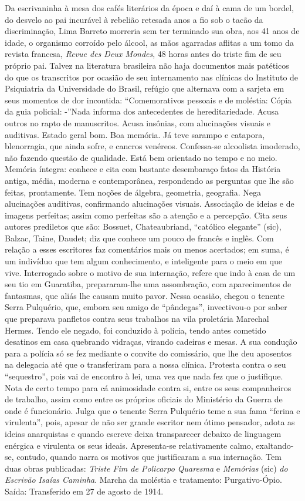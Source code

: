 \documentclass[
  letterpaper,
  DIV=11,
  numbers=noendperiod]{scrreprt}
\begin{document}
Da escrivaninha à mesa dos cafés literários da época e daí à cama de um
bordel, do desvelo ao pai incurável à rebelião retesada anos a fio sob o
tacão da discriminação, Lima Barreto morreria sem ter terminado sua
obra, aos 41 anos de idade, o organismo corroído pelo álcool, as mãos
agarradas aflitas a um tomo da revista francesa, \emph{Revue des Deux
Mondes}, 48 horas antes do triste fim de seu próprio pai. Talvez na
literatura brasileira não haja documentos mais patéticos do que os
transcritos por ocasião de seu internamento nas clínicas do Instituto de
Psiquiatria da Universidade do Brasil, refúgio que alternava com a
sarjeta em seus momentos de dor incontida: ``Comemorativos pessoais e de
moléstia: Cópia da guia policial: -''Nada informa dos antecedentes de
hereditariedade. Acusa outros no rapto de manuscritos. Acusa insônias,
com alucinações visuais e auditivas. Estado geral bom. Boa memória. Já
teve sarampo e catapora, blenorragia, que ainda sofre, e cancros
venéreos. Confessa-se alcoolista imoderado, não fazendo questão de
qualidade. Está bem orientado no tempo e no meio. Memória íntegra:
conhece e cita com bastante desembaraço fatos da História antiga, média,
moderna e contemporânea, respondendo as perguntas que lhe são feitas,
prontamente. Tem noções de álgebra, geometria, geografia. Nega
alucinações auditivas, confirmando alucinações visuais. Associação de
ideias e de imagens perfeitas; assim como perfeitas são a atenção e a
percepção. Cita seus autores prediletos que são: Bossuet, Chateaubriand,
``católico elegante'' (sic), Balzac, Taine, Daudet; diz que conhece um
pouco de francês e inglês. Com relação a esses escritores faz
comentários mais ou menos acertados; em suma, é um indivíduo que tem
algum conhecimento, e inteligente para o meio em que vive. Interrogado
sobre o motivo de sua internação, refere que indo à casa de um seu tio
em Guaratiba, prepararam-lhe uma assombração, com aparecimentos de
fantasmas, que aliás lhe causam muito pavor. Nessa ocasião, chegou o
tenente Serra Pulquério, que, embora seu amigo de ``pândegas'',
invectivou-o por saber que preparava panfletos contra seus trabalhos na
vila proletária Marechal Hermes. Tendo ele negado, foi conduzido à
polícia, tendo antes cometido desatinos em casa quebrando vidraças,
virando cadeiras e mesas. A sua condução para a polícia só se fez
mediante o convite do comissário, que lhe deu aposentos na delegacia até
que o transferiram para a nossa clínica. Protesta contra o seu
``sequestro'', pois vai de encontro à lei, uma vez que nada fez que o
justifique. Nota de certo tempo para cá animosidade contra si, entre os
seus companheiros de trabalho, assim como entre os próprios oficiais do
Ministério da Guerra de onde é funcionário. Julga que o tenente Serra
Pulquério teme a sua fama ``ferina e virulenta'', pois, apesar de não
ser grande escritor nem ótimo pensador, adota as ideias anarquistas e
quando escreve deixa transparecer debaixo de linguagem enérgica e
virulenta os seus ideais. Apresenta-se relativamente calmo,
exaltando-se, contudo, quando narra os motivos que justificaram a sua
internação. Tem duas obras publicadas: \emph{Triste Fim de Policarpo
Quaresma} e \emph{Memórias} (sic) \emph{do Escrivão Isaías Caminha}.
Marcha da moléstia e tratamento: Purgativo-Ópio. Saída: Transferido em
27 de agosto de 1914.
\end{document}
